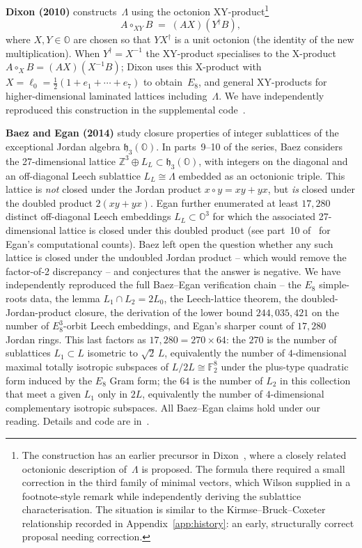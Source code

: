 \documentclass[twoside,english]{paper}
\numberwithin{equation}{section}
\numberwithin{figure}{section}
\theoremstyle{definition}
\theoremstyle{remark}
\newcommand{\OO}{\mathbb{O}}          %
\newcommand{\ZZ}{\mathbb{Z}}
\newcommand{\FF}{\mathbb{F}}
\newcommand{\LL}{\Lambda}             %
\begin{document}
\textbf{Dixon (2010)} \cite{Dixon2010} constructs~$\LL$ using the
octonion XY-product\footnote{The construction has an earlier precursor
in Dixon~\cite{Dixon1995}, where a closely related octonionic
description of~$\LL$ is proposed.  The formula there required a small
correction in the third family of minimal vectors, which Wilson
\cite[end of \S5]{Wilson2009} supplied in a footnote-style remark
while independently deriving the sublattice characterisation.  The
situation is similar to the Kirmse--Bruck--Coxeter relationship recorded
in Appendix~\ref{app:history}: an early, structurally correct proposal
needing correction.}
\[
  A \circ_{XY} B \;=\; (A X)(Y^{\dagger} B),
\]
where $X, Y \in \OO$ are chosen so that $Y X^{\dagger}$ is a unit
octonion (the identity of the new multiplication).  When $Y^{\dagger} = X^{-1}$
the XY-product specialises to the X-product $A \circ_X B = (AX)(X^{-1}
B)$; Dixon uses this X-product with $X = \ell_0 = \frac{1}{2}(1 + e_1
+ \cdots + e_7)$ to obtain~$E_8$, and general XY-products for
higher-dimensional laminated lattices including~$\LL$.  We have
independently reproduced this construction in the supplemental
code~\cite{repo}.

\textbf{Baez and Egan (2014)} \cite{Baez2014} study closure
properties of integer sublattices of the exceptional Jordan algebra
$\mathfrak{h}_3(\OO)$.  In parts~9--10 of the series, Baez considers
the 27-dimensional lattice $\ZZ^3 \oplus L_L \subset \mathfrak{h}_3(\OO)$,
with integers on the diagonal and an off-diagonal Leech sublattice
$L_L \cong \LL$ embedded as an octonionic triple.  This lattice is
\emph{not} closed under the Jordan product $x \circ y = xy + yx$,
but \emph{is} closed under the doubled product $2(xy + yx)$.
Egan further enumerated at least $17{,}280$ distinct off-diagonal
Leech embeddings $L_L \subset \OO^3$ for which the associated
27-dimensional lattice is closed under this doubled product
(see part~10 of~\cite{Baez2014} for Egan's computational counts).
Baez left open the question whether any such lattice is closed under
the undoubled Jordan product -- which would remove the factor-of-2
discrepancy -- and conjectures that the answer is negative.  We
have independently reproduced the full Baez--Egan verification chain
-- the $E_8$ simple-roots data, the lemma $L_1 \cap L_2 = 2L_0$, the
Leech-lattice theorem, the doubled-Jordan-product closure, the
derivation of the lower bound $244{,}035{,}421$ on the number of
$E_8^3$-orbit Leech embeddings, and Egan's sharper count of
$17{,}280$ Jordan rings.  This last factors as $17{,}280 = 270
\times 64$: the $270$ is the number of sublattices $L_1 \subset L$
isometric to $\sqrt{2}\,L$, equivalently the number of $4$-dimensional
maximal totally isotropic subspaces of $L/2L \cong \FF_2^8$ under the
plus-type quadratic form induced by the $E_8$ Gram form; the $64$ is
the number of $L_2$ in this collection that meet a given $L_1$ only
in $2L$, equivalently the number of $4$-dimensional complementary
isotropic subspaces.  All Baez--Egan claims hold under our reading.
Details and code are in~\cite{repo}.
\end{document}
